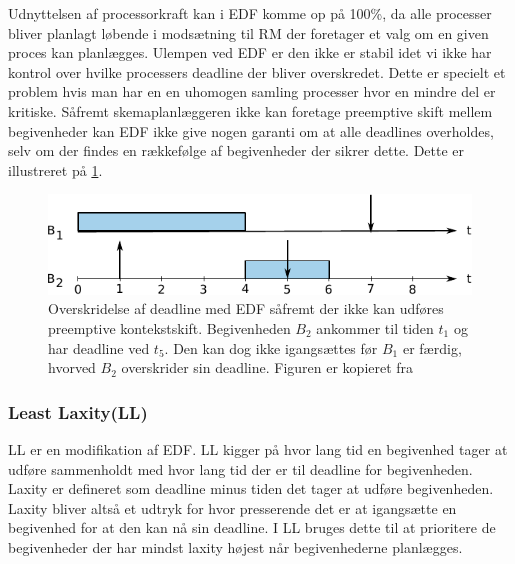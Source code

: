 Udnyttelsen af processorkraft kan i EDF komme op på 100\%, da alle processer bliver planlagt løbende i modsætning til RM der foretager et valg om en given proces kan planlægges.  Ulempen ved EDF er den ikke er stabil idet vi ikke har kontrol over hvilke processers deadline der bliver overskredet. Dette er specielt et problem hvis man har en en uhomogen samling processer hvor en mindre del er kritiske. Såfremt skemaplanlæggeren ikke kan foretage preemptive skift mellem begivenheder kan EDF ikke give nogen garanti om at alle deadlines overholdes, selv om der findes en rækkefølge af begivenheder der sikrer dette. Dette er illustreret på \cref{fig:edf-nonpreemptive}.

\begin{figure}
 \begin{center}
  \includegraphics[scale=1.00]{images/edf-nonpreemptive}
  \caption{Overskridelse af deadline med EDF såfremt der ikke kan udføres preemptive kontekstskift. Begivenheden $B_2$ ankommer til tiden $t_1$ og har deadline ved $t_5$. Den kan dog ikke igangsættes før $B_1$ er færdig, hvorved $B_2$ overskrider sin deadline. Figuren er kopieret fra \cite[56]{buttazzo2005}}
  \label{fig:edf-nonpreemptive}
  \end{center}
\end{figure}

\subsubsection{Least Laxity(LL)}
LL er en modifikation af EDF. LL kigger på hvor lang tid en begivenhed tager at udføre sammenholdt med hvor lang tid der er til deadline for begivenheden. Laxity er defineret som deadline minus tiden det tager at udføre begivenheden. Laxity bliver altså et udtryk for hvor presserende det er at igangsætte en begivenhed for at den kan nå sin deadline. I LL bruges dette til at prioritere de begivenheder der har mindst laxity højest når begivenhederne planlægges. 
